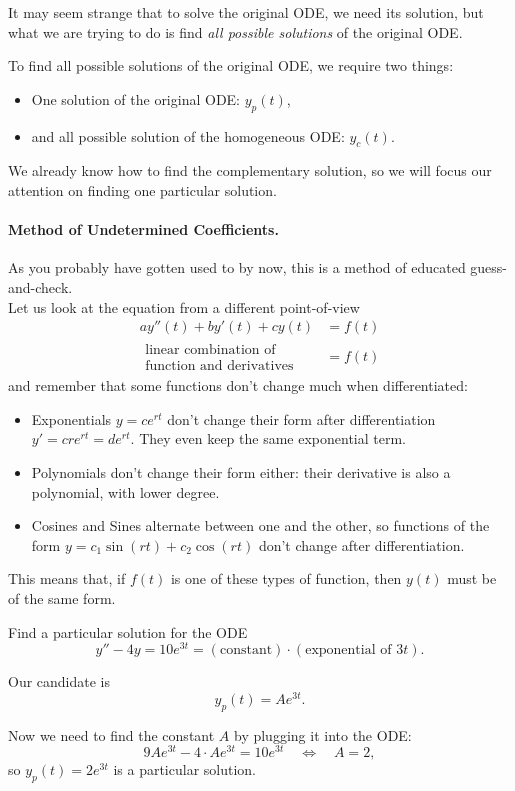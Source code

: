 \begin{important}
It may seem strange that to solve the original ODE, we need its solution, but what we are trying to do is find \emph{all possible solutions} of the original ODE.

To find all possible solutions of the original ODE, we require two things:
\begin{itemize}
	\item One solution of the original ODE:  $y_p(t)$,
	\item and all possible solution of the homogeneous ODE: $y_c(t)$.
\end{itemize}
\end{important}


We already know how to find the complementary solution, so we will focus our attention on finding one particular solution.

\paragraph{\color{cyan}Method of Undetermined Coefficients.} As you probably have gotten used to by now, this is a method of educated guess-and-check. \\

Let us look at the equation from a different point-of-view
\begin{align*}
a y''(t) + by'(t) + cy(t) & = f(t) \\
\substack{\displaystyle\text{linear combination of}\\\displaystyle\text{function and derivatives}} & = f(t)
\end{align*}
and remember that some functions don't change much when differentiated:
\begin{itemize}
	\item Exponentials $y=ce^{rt}$ don't change their form after differentiation $y'=cre^{rt} = de^{rt}$. They even keep the same exponential term.
	\item Polynomials don't change their form either: their derivative is also a polynomial, with lower degree.
	\item Cosines and Sines alternate between one and the other, so functions of the form $y=c_1 \sin(rt) + c_2\cos(rt)$ don't change after differentiation.
\end{itemize}

This means that, if $f(t)$ is one of these types of function, then $y(t)$ must be of the same form.	


\begin{example}
Find a particular solution for the ODE
$$
y''  - 4y = 10 e^{3t} = (\text{constant}) \cdot (\text{exponential of } 3t).
$$	

Our candidate is
$$
y_p(t) = A e^{3t}.
$$

Now we need to find the constant $A$ by plugging it into the ODE:
$$
9 A e^{3t} - 4 \cdot A e^{3t} = 10 e^{3t}
\quad \Leftrightarrow \quad 
	A = 2,
$$
so $y_p(t) = 2 e^{3t}$ is a particular solution.
\end{example}


